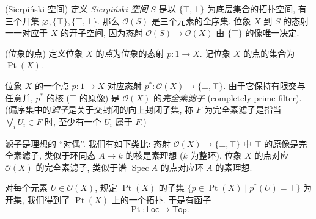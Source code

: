 \begin{example}
	{(Sierpi\'nski 空间)}
	定义 \emph{Sierpi\'nski 空间} $S$ 是以 $\{\top,\bot\}$ 为底层集合的拓扑空间, 有三个开集 $\varnothing, \{\top\}, \{\top,\bot\}$. 那么 $\mathcal O(S)$ 是三个元素的全序集.
	位象 $X$ 到 $S$ 的态射一一对应于 $X$ 的开子空间, 因为\fm{}态射  $\mathcal O(S)\to\mathcal O(X)$ 由 $\{\top\}$ 的像唯一决定.
\end{example}


\begin{definition}
	[label={points-of-locale}]
	{(位象的点)}
	定义位象 $X$ 的\emph{点}为位象的态射 $p\colon 1 \to X$.
	记位象 $X$ 的点的集合为 $\operatorname{Pt}(X)$.
\end{definition}

位象 $X$ 的一个点 $p\colon 1 \to X$ 对应\fm{}态射 $p^*\colon \mathcal O(X) \to \{\bot,\top\}$.
由于它保持有限交与任意并, $p^*$ 的核 ($\top$ 的原像) 是 $\mathcal O(X)$ 的\emph{完全素滤子} (completely prime filter). (偏序集中的\emph{滤子}是关于交封闭的向上封闭子集, 称 $F$ 为完全素滤子是指当 $\bigvee_i U_i \in F$ 时, 至少有一个 $U_i$ 属于 $F$.)

\begin{remark}
	[label={completely-prime-filter-vs-prime-ideal}]
	{}
	滤子是理想的 ``对偶''. 我们有如下类比: 态射 $\mathcal O(X)\to \{\bot,\top\}$ 中 $\top$ 的原像是完全素滤子, 类似于环同态 $A\to k$ 的核是素理想 ($k$ 为整环). 位象 $X$ 的点对应 $\mathcal O(X)$ 的完全素滤子, 类似于谱 $\operatorname{Spec}A$ 的点对应环 $A$ 的素理想.
\end{remark}

对每个元素 $U\in\mathcal O(X)$, 规定 $\operatorname{Pt}(X)$ 的子集
$\{p \in \operatorname{Pt}(X) \mid p^*(U) = \top\}$ 为开集,
我们得到了 $\operatorname{Pt}(X)$ 上的一个拓扑. 于是有函子
$$\operatorname{Pt} \colon \mathsf {Loc} \to \mathsf {Top}.$$

